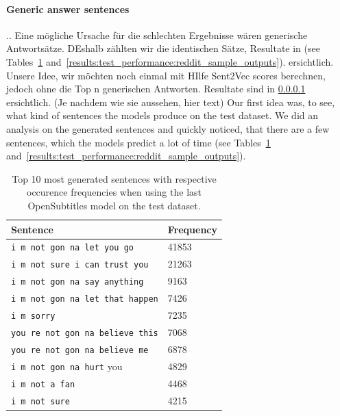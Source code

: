 \paragraph{Generic answer sentences}.. Eine mögliche Ursache für die schlechten Ergebnisse wären generische Antwortsätze. DEshalb zählten wir die identischen Sätze, Resultate in (see Tables~\ref{results:test_performance:opensubtitles_sample_outputs} and~\ref{results:test_performance:reddit_sample_outputs}). ersichtlich. Unsere Idee, wir möchten noch einmal mit HIlfe Sent2Vec scores berechnen, jedoch ohne die Top n generischen Antworten. Resultate sind in \ref{} ersichtlich. (Je nachdem wie sie aussehen, hier text)
Our first idea was, to see, what kind of sentences the models produce on the test dataset. We did an analysis on the generated sentences and quickly noticed, that there are a few sentences, which the models predict a lot of time (see Tables~\ref{results:test_performance:opensubtitles_sample_outputs} and~\ref{results:test_performance:reddit_sample_outputs}).
\begin{table}[H]
	\centering
	\begin{adjustbox}{max width=\textwidth}
		\begin{tabular}{ll}
			\toprule
			Sentence & Frequency\\ \midrule
			\texttt{i m not gon na let you go} & 41853\\
			\texttt{i m not sure i can trust you} & 21263\\
			\texttt{i m not gon na say anything} & 9163\\
			\texttt{i m not gon na let that happen} & 7426\\
			\texttt{i m sorry} & 7235\\
			\texttt{you re not gon na believe this} & 7068\\
			\texttt{you re not gon na believe me} & 6878\\
			\texttt{i m not gon na hurt} you & 4829\\
			\texttt{i m not a fan} & 4468\\
			\texttt{i m not sure} & 4215\\
			\bottomrule
		\end{tabular}
	\end{adjustbox}
	\caption{Top 10 most generated sentences with respective occurence frequencies when using the last OpenSubtitles model on the test dataset.}
	\label{results:test_performance:opensubtitles_sample_outputs}
\end{table}

